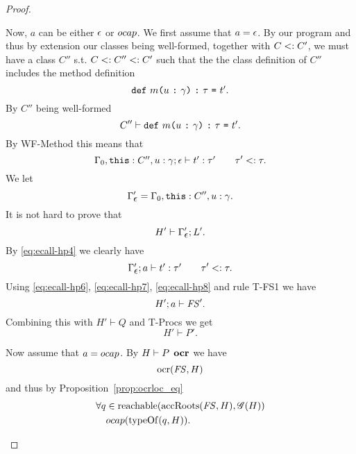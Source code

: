 \begin{proof}
\begin{description}
\begin{description}
          Now, $a$ can be either $\mbox{$\epsilon$}$ or $\mbox{$ocap$}$. We first assume that $a =
          \mbox{$\epsilon$}$.
          By our program and thus by extension our classes being well-formed, together
          with $C <: C'$, we must have a class $C''$ s.t. $C <: C'' <:
          C'$ such that the the class definition of $C''$ includes the method
          definition
          \begin{equation*}
            \mbox{\mdseries\texttt{def}~$m$\texttt{(}$u$~\texttt{:}~$\gamma$\texttt{)}~\texttt{:}~$\tau$~\texttt{=}~$t'$}.
          \end{equation*}
          By $C''$ being well-formed
          \begin{equation}
            C'' \vdash \mbox{\mdseries\texttt{def}~$m$\texttt{(}$u$~\texttt{:}~$\gamma$\texttt{)}~\texttt{:}~$\tau$~\texttt{=}~$t'$}.
          \end{equation}
          By {\sc WF-Method} this means that
          \begin{equation} \label{eq:ecall-hp4}
            \mbox{$\Gamma_0,\mbox{\mdseries\texttt{this}}: C'', u: \gamma;\mbox{$\epsilon$}\vdash t':\tau'$}
            \quad\quad \tau' <: \tau.
          \end{equation}
          We let
          \begin{equation}
            \Gamma_{\mbox{$\epsilon$}}' = \Gamma_0, \mbox{\mdseries\texttt{this}}: C'', u: \gamma.
          \end{equation}
          It is not hard to prove that 
          \begin{equation} \label{eq:ecall-hp7}
            H' \vdash \Gamma_{\mbox{$\epsilon$}}'; L'.
          \end{equation}
          By \eqref{eq:ecall-hp4} we clearly have
          \begin{equation} \label{eq:ecall-hp8}
            \mbox{$\Gamma_{\mbox{$\epsilon$}}';a\vdash t':\tau'$} \quad\quad \tau' <: \tau.
          \end{equation}
          Using  \eqref{eq:ecall-hp6}, \eqref{eq:ecall-hp7},
          \eqref{eq:ecall-hp8} and rule {\sc T-FS1} we have
          \begin{equation}
            H';a \vdash \mathit{FS}'.
          \end{equation}
          Combining this with $H' \vdash Q$ and {\sc T-Procs} we get
          \begin{equation}
            H' \vdash P'.
          \end{equation}

          Now assume that $a = \mbox{$ocap$}$. By $H \vdash P \:\: \mbox{\bf ocr}$ we have
          \begin{equation}
            \mbox{$\mathrm{ocr}$}(\mathit{FS}, H)
          \end{equation}
          and thus by Proposition~\ref{prop:ocrloc_eq}
          \begin{equation}
            \begin{aligned}
              \forall q &\in \mbox{$\mathrm{reachable}$}(\mbox{$\mathrm{accRoots}$}(\mathit{FS}, H), \mathscr{G}(H)) \\
              & \mbox{$ocap$}(\mbox{$\mathrm{typeOf}$}(q, H)).
            \end{aligned}
          \end{equation}
          

\end{description}
\end{description}
\end{proof}
